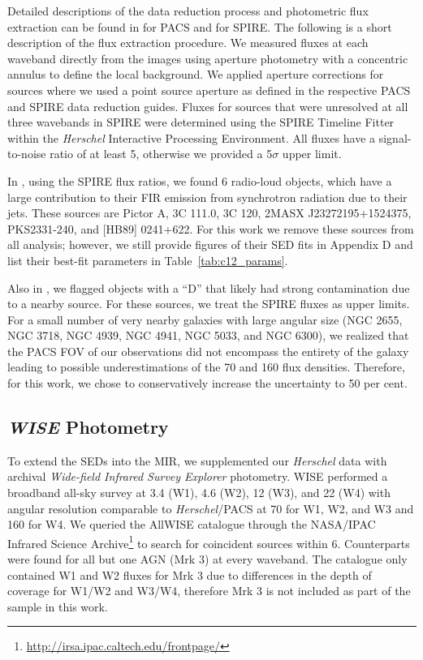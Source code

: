 \documentclass[fleqn, usenatbib]{mnras}
\newcommand{\herschel}{\emph{Herschel}}
\begin{document}
Detailed descriptions of the data reduction process and photometric flux extraction can be found in \citet{Melendez:2014yu} for PACS and \citet{Shimizu:2016qy} for SPIRE. The following is a short description of the flux extraction procedure. We measured fluxes at each waveband directly from the images using aperture photometry with a concentric annulus to define the local background. We applied aperture corrections for sources where we used a point source aperture as defined in the respective PACS and SPIRE data reduction guides. Fluxes for sources that were unresolved at all three wavebands in SPIRE were determined using the SPIRE Timeline Fitter within the \herschel{} Interactive Processing Environment. All fluxes have a signal-to-noise ratio of at least 5, otherwise we provided a 5$\sigma$ upper limit. 

In \citet{Shimizu:2016qy}, using the SPIRE flux ratios, we found 6 radio-loud objects, which have a large contribution to their FIR emission from synchrotron radiation due to their jets. These sources are Pictor A, 3C 111.0, 3C 120, 2MASX J23272195+1524375, PKS2331-240, and [HB89] 0241+622. For this work we remove these sources from all analysis; however, we still provide figures of their SED fits in Appendix D and list their best-fit parameters in Table~\ref{tab:c12_params}. 

Also in \citet{Shimizu:2016qy}, we flagged objects with a ``D'' that likely had strong contamination due to a nearby source. For these sources, we treat the SPIRE fluxes as upper limits. For a small number of very nearby galaxies with large angular size (NGC 2655, NGC 3718, NGC 4939, NGC 4941, NGC 5033, and NGC 6300), we realized that the PACS FOV of our observations did not encompass the entirety of the galaxy leading to possible underestimations of the 70 and 160 \micron{} flux densities. Therefore, for this work, we chose to conservatively increase the uncertainty to 50 per cent.

\subsection{\textit{WISE} Photometry}
To extend the SEDs into the MIR, we supplemented our \herschel{} data with archival \textit{Wide-field Infrared Survey Explorer} \citep[WISE;][]{Wright:2010fk} photometry. WISE performed a broadband all-sky survey at 3.4 (W1), 4.6 (W2), 12 (W3), and 22 (W4) \micron{} with angular resolution comparable to \herschel/PACS at 70 \micron{} for W1, W2, and W3 and 160 \micron{} for W4. We queried the AllWISE catalogue through the NASA/IPAC Infrared Science Archive\footnote{\url{http://irsa.ipac.caltech.edu/frontpage/}} to search for coincident sources within 6\arcsec. Counterparts were found for all but one AGN (Mrk 3) at every waveband. The catalogue only contained W1 and W2 fluxes for Mrk 3 due to differences in the depth of coverage for W1/W2 and W3/W4, therefore Mrk 3 is not included as part of the sample in this work.
\end{document}
